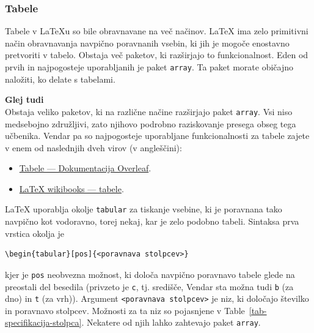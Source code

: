 \subsubsection{Tabele}\label{latexOsnovnaOkolja_tabele}

Tabele v LaTeXu so bile obravnavane na več načinov.
LaTeX ima zelo primitivni način obravnavanja navpično poravnanih vsebin, ki jih je mogoče enostavno pretvoriti v tabelo.
Obstaja več paketov, ki razširjajo to funkcionalnost.
Eden od prvih in najpogosteje uporabljanih je paket \texttt{array}.
Ta paket morate običajno naložiti, ko delate s tabelami.

\begin{framed}
\textbf{Glej tudi}\\
Obstaja veliko paketov, ki na različne načine razširjajo paket \texttt{array}.
Vsi niso medsebojno združljivi, zato njihovo podrobno raziskovanje presega obseg tega učbenika.
Vendar pa so najpogosteje uporabljane funkcionalnosti za tabele zajete v enem od naslednjih dveh virov (v angleščini):

\begin{itemize}
\item \href{https://www.overleaf.com/learn/latex/Tables}{Tabele --- Dokumentacija Overleaf}.
\item \href{https://en.wikibooks.org/wiki/LaTeX/Tables}{LaTeX wikibooks --- tabele}.
\end{itemize}
\end{framed}

LaTeX uporablja okolje \texttt{tabular} za tiskanje vsebine, ki je poravnana tako navpično kot vodoravno, torej nekaj, kar je zelo podobno tabeli.
Sintaksa prva vrstica okolja je

\begin{verbatim}
\begin{tabular}[pos]{<poravnava stolpcev>}
\end{verbatim}

kjer je \texttt{pos} neobvezna možnost, ki določa navpično poravnavo tabele glede na preostali del besedila (privzeto je \texttt{c}, tj. središče, Vendar sta možna tudi \texttt{b} (za dno) in \texttt{t} (za vrh)).
Argument \texttt{\textless poravnava stolpcev\textgreater } je niz, ki določajo številko in poravnavo stolpcev.
Možnosti za ta niz so pojasnjene v Table~\ref{tab-specifikacija-stolpca}. Nekatere od njih lahko zahtevajo paket \texttt{array}.

